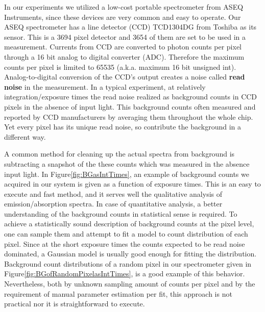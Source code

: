 In our experiments we utilized a low-cost portable spectrometer from ASEQ 
Instruments, since these devices are very common and easy to operate. Our
ASEQ spectrometer has a line detector (CCD) TCD1304DG from Toshiba as its 
sensor. This is a 3694 pixel detector and 3654 of them are set to be used 
in a measurement. Currents from CCD are converted to photon counts per pixel 
through a 16 bit analog to digital converter (ADC). Therefore the maximum 
counts per pixel is limited to 65535 (a.k.a. maximum 16 bit unsigned int). 
Analog-to-digital conversion of the CCD's output creates a noise called 
\textbf{read noise} in the measurement. In a typical experiment, at relatively 
integration/exposure times the read noise realized as background counts in
CCD pixels in the absence of input light. This background counts often 
measured and reported by CCD manufacturers by averaging them throughout
the whole chip. Yet every pixel has its unique read noise, so contribute the
background in a different way.  

A common method for cleaning up the actual spectra from background is 
subtracting a snapshot of the these counts which was measured in the absence 
input light. In Figure\ref{fig:BGasIntTimes}, an example of 
background counts we acquired in our system is given as a function of exposure 
times. This is an easy to execute and fast method, and it serves well the 
qualitative analysis of emission/absorption spectra. In case of quantitative 
analysis, a better understanding of the background counts in statistical sense is 
required. To achieve a statistically sound description of background counts at the 
pixel level, one can sample them and attempt to fit a model to count distribution 
of each pixel. Since at the short exposure times the counts expected to be read 
noise dominated, a Gaussian model is usually good enough for fitting the 
distribution. Background count distributions of a random pixel
in our spectrometer given in Figure\ref{fig:BGofRandomPixelasIntTimes}, is a good
example of this behavior. Nevertheless, both by unknown sampling amount
of counts per pixel and by the requirement of manual parameter estimation per
fit, this approach is not practical nor it is straightforward to execute.

